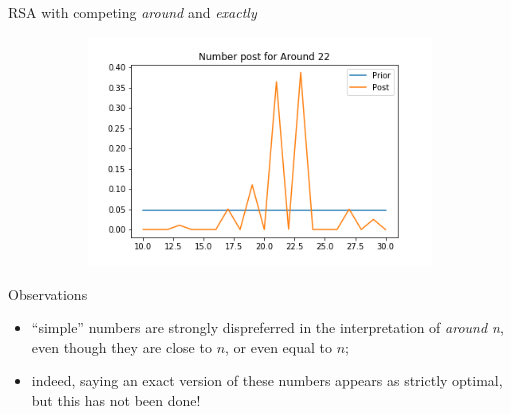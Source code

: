 \documentclass[xcolor=table, hyperref={pdfpagelabels=false}]{beamer}
\begin{document}
\begin{frame}{RSA with competing \textit{around} and \textit{exactly}}
\begin{minipage}{.4\textwidth}
\begin{figure}[H]
\begin{subfigure}[b]{.8\textwidth}
		\includegraphics[width=\textwidth]{./images/number_post_around_22_exactly.png}
	\end{subfigure}
\end{figure}
\end{minipage}
\begin{minipage}{.55\textwidth}
	\begin{block}{Observations}
		\begin{itemize}
			\item ``simple'' numbers are strongly dispreferred in the interpretation of \textit{around n}, even though they are close to $n$, or even equal to $n$;
			\item indeed, saying an exact version of these numbers appears as strictly optimal, but this has not been done!
		\end{itemize}
	\end{block}
\end{minipage}
\end{frame}
\end{document}
